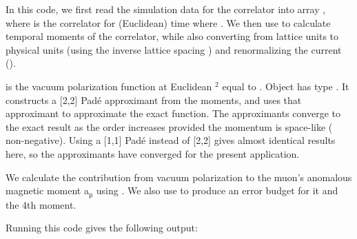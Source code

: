 \documentclass[letterpaper,10pt,english]{sphinxmanual}
\begin{document}
\begin{sphinxVerbatim}[commandchars=\\\{\}]
   
\end{sphinxVerbatim}

In this code, we first read the simulation data for the  correlator into
array , where  is the correlator for (Euclidean) time  
where . We then use {\hyperref[\detokenize{g2tools:g2tools.moments}]{}} to calculate
temporal moments of the correlator, while also converting from lattice units
to physical units (using the inverse lattice spacing )  and
renormalizing the current ().

 is the vacuum polarization function at Euclidean $^{\text{2}}$
equal to . Object  has type {\hyperref[\detokenize{g2tools:g2tools.vacpol}]{}}. It
constructs a  {[}2,2{]} Padé approximant from the moments,
and uses that approximant to  approximate the exact function.
The approximants converge to the exact result as the order
increases provided the momentum is space-like ( non-negative).
Using a {[}1,1{]} Padé instead of {[}2,2{]} gives almost identical results here, so the
approximants have converged for the present application.

We calculate the contribution from vacuum polarization 
to the muon’s anomalous magnetic moment a$_{\text{µ}}$ using
. We also use 
to produce an error budget for it and the 4th moment.

Running this code gives the following output:
\end{document}
